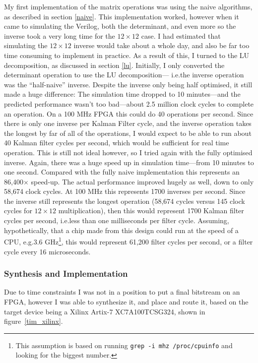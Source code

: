 \documentclass[12pt]{article}
\begin{document}
My first implementation of the matrix operations was using the naive algorithms, as described in section \ref{naive}. This implementation worked, however when it came to simulating the Verilog, both the determinant, and even more so the inverse took a very long time for the $12 \times 12$ case. I had estimated that simulating the $12 \times 12$ inverse would take about a whole day, and also be far too time consuming to implement in practice. As a result of this, I turned to the LU decomposition, as discussed in section \ref{lu}. Initially, I only converted the determinant operation to use the LU decomposition--- i.e.\@ the inverse operation was the ``half-naive'' inverse. Despite the inverse only being half optimised, it still made a huge difference: The simulation time dropped to 10 minutes---and the predicted performance wasn't too bad---about 2.5 million clock cycles to complete an operation. On a 100 MHz FPGA this could do 40 operations per second. Since there is only one inverse per Kalman Filter cycle, and the inverse operation takes the longest by far of all of the operations, I would expect to be able to run about 40 Kalman filter cycles per second, which would be sufficient for real time operation. This is still not ideal however, so I tried again with the fully optimised inverse. Again, there was a huge speed up in simulation time---from 10 minutes to one second. Compared with the fully naive implementation this represents an 86,400$\times$ speed-up. The actual performance improved hugely as well, down to only 58,674 clock cycles. At 100 MHz this represents 1700 inverses per second. Since the inverse still represents the longest operation (58,674 cycles versus 145 clock cycles for $12\times12$ multiplication), then this would represent 1700 Kalman filter cycles per second, i.e.\@ less than one milliseconds per filter cycle. Assuming, hypothetically, that a chip made from this design could run at the speed of a CPU, e.g.\@ 3.6 GHz\footnote{This assumption is based on running \lstinline|grep -i mhz /proc/cpuinfo| and looking for the biggest number.}, this would represent 61,200 filter cycles per second, or a filter cycle every 16 microseconds.

\subsubsection{Synthesis and Implementation}

Due to time constraints I was not in a position to put a final bitstream on an FPGA, however I was able to synthesize it, and place and route it, based on the target device being a Xilinx Artix-7 XC7A100TCSG324, shown in figure~\ref{tim_xilinx}.
\end{document}
